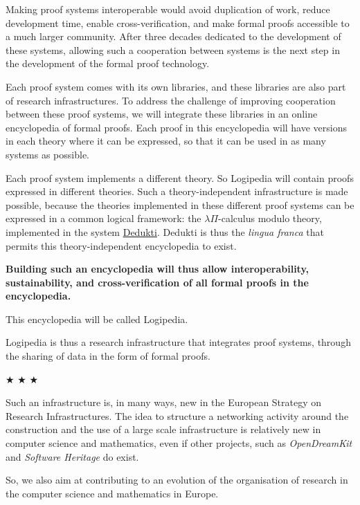 Making proof systems interoperable would avoid duplication of work,
reduce development time, enable cross-verification, and make formal
proofs accessible to a much larger community.  After three decades
dedicated to the development of these systems, allowing such a
cooperation between systems is the next step in the development of the
formal proof technology.

Each proof system comes with its own libraries, and these libraries
are also part of research infrastructures. To address the challenge of
improving cooperation between these proof systems, we will integrate
these libraries in an online encyclopedia of formal proofs. Each proof
in this encyclopedia will have versions in each theory where it can be
expressed, so that it can be used in as many systems as possible.

Each proof system implements a different theory. So Logipedia will
contain proofs expressed in different theories.  Such a
theory-independent infrastructure is made possible, because the
theories implemented in these different proof systems can be expressed
in a common logical framework: the $\lambda \Pi$-calculus modulo
theory, implemented in the system
\href{https://deducteam.github.io/}{Dedukti}. Dedukti is thus the {\em
  lingua franca} that permits this theory-independent encyclopedia to
exist.

{\bf Building such an encyclopedia will thus allow interoperability,
  sustainability, and cross-verification of all formal proofs in the
  encyclopedia.}

This encyclopedia will be called Logipedia.

Logipedia is thus a research infrastructure that integrates proof
systems, through the sharing of data in the form of formal proofs.

\begin{center}
$\bigstar$ $\bigstar$ $\bigstar$
\end{center}

Such an infrastructure is, in many ways, new in the European Strategy
on Research Infrastructures. The idea to structure a networking
activity around the construction and the use of a large scale
infrastructure is relatively new in computer science and mathematics,
even if other projects, such as {\em OpenDreamKit} and {\em Software
Heritage} do exist.

So, we also aim at contributing to an evolution of the organisation of
research in the computer science and mathematics in Europe.



